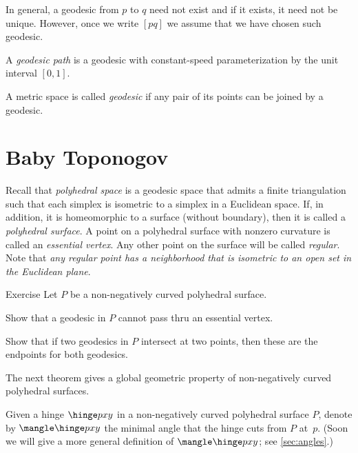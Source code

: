 In general, a geodesic from $p$ to $q$ need not exist and if it exists, it need not  be unique.  
However, once we write $[p q]$ we assume that we have chosen such geodesic.

A \emph{geodesic path} is a geodesic with constant-speed parameterization by the unit interval $[0,1]$.

A metric space is called \emph{geodesic} if any pair of its points can be joined by a geodesic.

\section{Baby Toponogov}

Recall that \emph{polyhedral space} is a geodesic space that admits a finite triangulation such that each simplex is isometric to a simplex in a Euclidean space.
If, in addition, it is homeomorphic to a surface (without boundary), then it is called a \emph{polyhedral surface}.
A point on a polyhedral surface with nonzero curvature is called an \emph{essential vertex}.
Any other point on the surface will be called \emph{regular}.
Note that \textit{any regular point has a neighborhood that is isometric to an open set in the Euclidean plane}.

\begin{thm}{Exercise}\label{ex:poly+geod}
Let $P$ be a non-negatively curved polyhedral surface.

\begin{subthm}{}
Show that a geodesic in $P$ cannot pass thru an essential vertex.
\end{subthm}

\begin{subthm}{}
Show that if two geodesics in $P$ intersect at two points, 
then these are the endpoints for both geodesics.
\end{subthm}

\end{thm}

The next theorem gives a global geometric property of non-negatively curved polyhedral surfaces.

Given a hinge $\hinge pxy$ in a non-negatively curved polyhedral surface $P$, denote by $\mangle\hinge pxy$ the minimal angle that the hinge cuts from $P$ at~$p$.
(Soon we will give a more general definition of $\mangle\hinge pxy$; see \ref{sec:angles}.)

